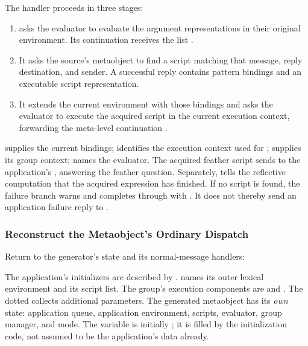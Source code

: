 The handler proceeds in three stages:
\begin{enumerate}
  \item {} asks the evaluator to evaluate the argument
        representations in their original environment. Its continuation
        receives the list .
  \item It asks the source's metaobject to find a script matching that
        message, reply destination, and sender. A successful reply contains
        pattern bindings and an executable script representation.
  \item It extends the current environment with those bindings and asks
        the evaluator to execute the acquired script in the current
        execution context, forwarding the meta-level continuation .
\end{enumerate}
 supplies the current bindings;  identifies the
execution context used for ;  supplies its group context;
 names the evaluator.
The acquired feather script sends  to the application's
, answering the feather question. Separately, 
tells the reflective computation that the acquired expression has finished.
If no script is found, the failure branch warns and completes through
 with . It does not thereby send an application failure
reply to .

\subsubsection{Reconstruct the Metaobject's Ordinary Dispatch}

Return to the generator's state and its normal-message handlers:

The application's initializers are described by .
 names its outer lexical environment and 
its script list. The group's execution components are 
and . The dotted  collects additional parameters.
The generated metaobject has its \emph{own} state: application queue,
application environment, scripts, evaluator, group manager, and mode.
The variable  is initially ; it is filled by the
initialization code, not assumed to be the application's data already.

